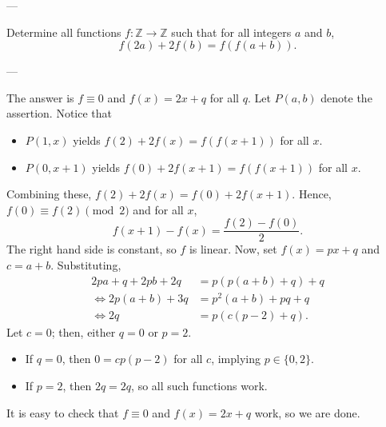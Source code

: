 
---

Determine all functions $f:\mathbb Z\to\mathbb Z$ such that for all integers $a$ and $b$, \[f(2a)+2f(b)=f(f(a+b)).\]

---

The answer is $f\equiv0$ and $f(x)=2x+q$ for all $q$. Let $P(a,b)$ denote the assertion. Notice that
\begin{itemize}
    \item $P(1,x)$ yields $f(2)+2f(x)=f(f(x+1))$ for all $x$.
        \vspace{-0.5em}
    \item $P(0,x+1)$ yields $f(0)+2f(x+1)=f(f(x+1))$ for all $x$.
\end{itemize}
Combining these, $f(2)+2f(x)=f(0)+2f(x+1)$. Hence, $f(0)\equiv f(2)\pmod2$ and for all $x$, \[f(x+1)-f(x)=\frac{f(2)-f(0)}2.\]
The right hand side is constant, so $f$ is linear. Now, set $f(x)=px+q$ and $c=a+b$. Substituting,
\begin{align*}
    2pa+q+2pb+2q&=p(p(a+b)+q)+q\\
    \iff2p(a+b)+3q&=p^2(a+b)+pq+q\\
    \iff2q&=p(c(p-2)+q).
\end{align*}
Let $c=0$; then, either $q=0$ or $p=2$.
\begin{itemize}
    \item If $q=0$, then $0=cp(p-2)$ for all $c$, implying $p\in\{0,2\}$.
        \vspace{-0.5em}
    \item If $p=2$, then $2q=2q$, so all such functions work.
\end{itemize}
It is easy to check that $f\equiv0$ and $f(x)=2x+q$ work, so we are done.

